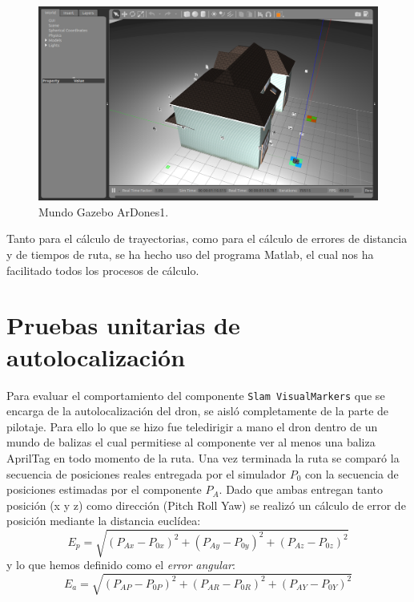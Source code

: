 \begin{figure}[H]
	\begin{center}
		\includegraphics[width=1\textwidth]{imag/IMG28.png}
				\caption{Mundo Gazebo ArDones1.}
		\label{fig:Mundo Gazebo.}	
	\end{center}
\end{figure}

\hspace{1cm} Tanto para el cálculo de trayectorias, como para el cálculo de errores de distancia y de tiempos de ruta, se ha hecho uso del programa Matlab, el cual nos ha facilitado todos los procesos de cálculo.

\section{Pruebas unitarias de autolocalización}
\hspace{1cm} Para evaluar el comportamiento del componente \texttt{Slam VisualMarkers} que se encarga de la autolocalización del dron, se aisló completamente de la parte de pilotaje. Para ello lo que se hizo fue teledirigir a mano el dron dentro de un mundo de balizas el cual permitiese al componente ver al menos una baliza AprilTag en todo momento de la ruta. Una vez terminada la ruta se comparó la secuencia de posiciones reales entregada por el simulador $P_{0}$ con la secuencia de posiciones estimadas por el componente $P_{A} $. Dado que ambas entregan tanto posición (x y z) como dirección (Pitch Roll Yaw) se realizó un cálculo de error de posición mediante la distancia euclídea: 
\[ E_{p} = \sqrt{(P_{Ax}-P_{0x})^{2}+(P_{Ay}-P_{0y})^{2}+(P_{Az}-P_{0z})^{2}}\]
y lo que hemos definido como el \textit{error angular}:    
\[ E_{a} = \sqrt{(P_{AP}-P_{0P})^{2}+(P_{AR}-P_{0R})^{2}+(P_{AY}-P_{0Y})^{2}}\]

